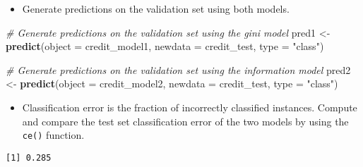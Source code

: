 \documentclass[
]{book}
\newenvironment{Shaded}{\begin{snugshade}}{\end{snugshade}}
\newcommand{\CommentTok}[1]{\textcolor[rgb]{0.56,0.35,0.01}{\textit{#1}}}
\newcommand{\DataTypeTok}[1]{\textcolor[rgb]{0.13,0.29,0.53}{#1}}
\newcommand{\KeywordTok}[1]{\textcolor[rgb]{0.13,0.29,0.53}{\textbf{#1}}}
\newcommand{\NormalTok}[1]{#1}
\newcommand{\OperatorTok}[1]{\textcolor[rgb]{0.81,0.36,0.00}{\textbf{#1}}}
\newcommand{\StringTok}[1]{\textcolor[rgb]{0.31,0.60,0.02}{#1}}
\providecommand{\tightlist}{%
  \setlength{\itemsep}{0pt}\setlength{\parskip}{0pt}}
\begin{document}
\begin{itemize}
\tightlist
\item
  Generate predictions on the validation set using both models.
\end{itemize}

\begin{Shaded}
\begin{Highlighting}[]
\CommentTok{# Generate predictions on the validation set using the gini model}
\NormalTok{pred1 <-}\StringTok{ }\KeywordTok{predict}\NormalTok{(}\DataTypeTok{object =}\NormalTok{ credit_model1,}
                 \DataTypeTok{newdata =}\NormalTok{ credit_test,}
                 \DataTypeTok{type =} \StringTok{"class"}\NormalTok{)    }

\CommentTok{# Generate predictions on the validation set using the information model}
\NormalTok{pred2 <-}\StringTok{ }\KeywordTok{predict}\NormalTok{(}\DataTypeTok{object =}\NormalTok{ credit_model2, }
                 \DataTypeTok{newdata =}\NormalTok{ credit_test,}
                 \DataTypeTok{type =} \StringTok{"class"}\NormalTok{)}
\end{Highlighting}
\end{Shaded}

\begin{itemize}
\tightlist
\item
  Classification error is the fraction of incorrectly classified instances. Compute and compare the test set classification error of the two models by using the \texttt{ce()} function.
\end{itemize}

\begin{Shaded}
\end{Shaded}

\begin{verbatim}
[1] 0.285
\end{verbatim}

\begin{Shaded}
\end{Shaded}
\end{document}
